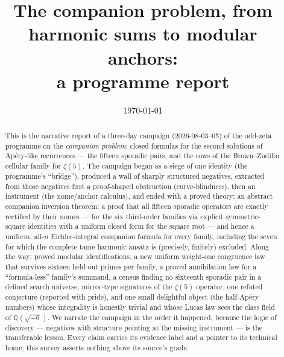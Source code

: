 \documentclass[11pt,reqno]{amsart}
\theoremstyle{plain}
\theoremstyle{definition}
\theoremstyle{remark}
\newcommand{\Q}{\mathbb{Q}}
\begin{document}
\title[The companion problem: a programme report]
      {The companion problem, from harmonic sums to modular anchors:\\
       a programme report}

\author{}
\date{\today}

\begin{abstract}
This is the narrative report of a three-day campaign (2026-08-03--05) of
the odd-zeta programme on the \emph{companion problem}: closed formulas for
the second solutions of Ap\'ery-like recurrences --- the fifteen sporadic
pairs, and the rows of the Brown--Zudilin cellular family for $\zeta(5)$.
The campaign began as a siege of one identity (the programme's
``bridge''), produced a wall of sharply structured negatives, extracted
from those negatives first a proof-shaped obstruction (curve-blindness),
then an instrument (the nome/anchor calculus), and ended with a proved
theory: an abstract companion inversion theorem; a proof that all fifteen
sporadic operators are exactly rectified by their nomes --- for the six
third-order families via explicit symmetric-square identities with a
uniform closed form for the square root --- and hence a uniform,
all-$n$ Eichler-integral companion formula for every family, including the
seven for which the complete tame harmonic ansatz is (precisely,
finitely) excluded. Along the way: proved modular identifications, a new
uniform weight-one congruence law that survives sixteen held-out primes
per family, a proved annihilation law for a ``formula-less'' family's
summand, a census finding no sixteenth sporadic pair in a defined search
universe, mirror-type signatures of the $\zeta(5)$ operator, one refuted
conjecture (reported with pride), and one small delightful object (the
half-Ap\'ery numbers) whose integrality is honestly trivial and whose
Lucas law sees the class field of $\Q(\sqrt{-6})$. We narrate the
campaign in the order it happened, because the logic of discovery ---
negatives with structure pointing at the missing instrument --- is the
transferable lesson. Every claim carries its evidence label and a pointer
to its technical home; this survey asserts nothing above its source's
grade.
\end{abstract}

\maketitle
\setcounter{tocdepth}{1}
\tableofcontents

\end{document}
